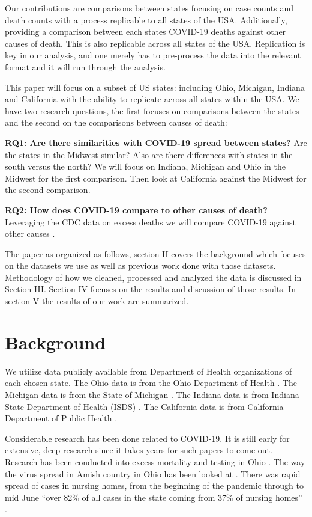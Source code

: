 \documentclass[conference]{IEEEtran}
\begin{document}
Our contributions are comparisons between states focusing on case counts and death counts with a process replicable to all states of the USA. 
Additionally, providing a comparison between each states COVID-19 deaths against other causes of death.
This is also replicable across all states of the USA.
Replication is key in our analysis, and one merely has to pre-process the data into the relevant format and it will run through the analysis.

This paper will focus on a subset of US states: including Ohio, Michigan, Indiana and California with the ability to replicate across all states within the USA.
We have two research questions, the first focuses on comparisons between the states and the second on the comparisons between causes of death:

\textbf{RQ1: Are there similarities with COVID-19 spread between states?} Are the states in the Midwest similar? Also are there differences with states in the south versus the north? We will focus on Indiana, Michigan and Ohio in the Midwest for the first comparison. Then look at California against the Midwest for the second comparison.

\textbf{RQ2: How does COVID-19 compare to other causes of death?} Leveraging the CDC data on excess deaths we will compare COVID-19 against other causes \cite{cdc_weekly_nodate}.


The paper as organized as follows, section II covers the background which focuses on the datasets we use as well as previous work done with those datasets.
Methodology of how we cleaned, processed and analyzed the data is discussed in Section III.
Section IV focuses on the results and discussion of those results.
In section V the results of our work are summarized.

\section{Background}

We utilize data publicly available from Department of Health organizations of each chosen state.
The Ohio data is from the Ohio Department of Health \cite{system_covid-19_nodate}.
The Michigan data is from the State of Michigan \cite{noauthor_coronavirus_nodate}.
The Indiana data is from Indiana State Department of Health (ISDS) \cite{noauthor_indiana_nodate}.
The California data is from California Department of Public Health \cite{noauthor_tracking_nodate}.

Considerable research has been done related to COVID-19. It is still early for extensive, deep research since it takes years for such papers to come out.
Research has been conducted into excess mortality and testing in Ohio \cite{quast_excess_2020}.
The way the virus spread in Amish country in Ohio has been looked at \cite{ali_covid-19_2020}.
There was rapid spread of cases in nursing homes, from the beginning of the pandemic through to mid June ``over 82\% of all cases in the state coming from 37\% of nursing homes'' \cite{bowblis_prevalence_2020}.
\end{document}
